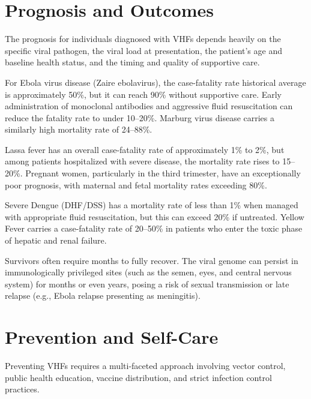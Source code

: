 \section*{Prognosis and Outcomes}
The prognosis for individuals diagnosed with VHFs depends heavily on the specific viral pathogen, the viral load at presentation, the patient's age and baseline health status, and the timing and quality of supportive care.

For Ebola virus disease (Zaire ebolavirus), the case-fatality rate historical average is approximately 50\%, but it can reach 90\% without supportive care. Early administration of monoclonal antibodies and aggressive fluid resuscitation can reduce the fatality rate to under 10--20\%. Marburg virus disease carries a similarly high mortality rate of 24--88\%.

Lassa fever has an overall case-fatality rate of approximately 1\% to 2\%, but among patients hospitalized with severe disease, the mortality rate rises to 15--20\%. Pregnant women, particularly in the third trimester, have an exceptionally poor prognosis, with maternal and fetal mortality rates exceeding 80\%.

Severe Dengue (DHF/DSS) has a mortality rate of less than 1\% when managed with appropriate fluid resuscitation, but this can exceed 20\% if untreated. Yellow Fever carries a case-fatality rate of 20--50\% in patients who enter the toxic phase of hepatic and renal failure.

Survivors often require months to fully recover. The viral genome can persist in immunologically privileged sites (such as the semen, eyes, and central nervous system) for months or even years, posing a risk of sexual transmission or late relapse (e.g., Ebola relapse presenting as meningitis).

\section*{Prevention and Self-Care}
Preventing VHFs requires a multi-faceted approach involving vector control, public health education, vaccine distribution, and strict infection control practices.

